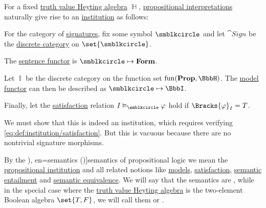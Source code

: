 \begin{definition}\label{def:propositional_institution}\mimprovised
  For a fixed \hyperref[def:truth_value_algebra]{truth value Heyting algebra} \( \BbbH \), \hyperref[def:propositional_valuation/interpretation]{propositional interpretations} naturally give rise to an \hyperref[def:institution]{institution} as follows:
  \begin{thmenum}
     For the category of \hyperref[def:institution/signatures]{signatures}, fix some symbol \( \anon \) and let \( \cat{Sign} \) be the \hyperref[def:discrete_category]{discrete category} on \( \set{ \anon } \).

     The \hyperref[def:institution/sentences]{sentence functor} is \( \anon \mapsto \op*{Form} \).

     Let \( \BbbI \) be the discrete category on the function set \( \fun(\op*{Prop}, \BbbH) \). The \hyperref[def:institution/models]{model functor} can then be described as \( \anon \mapsto \BbbI \).

     Finally, let the \hyperref[def:institution/satisfaction]{satisfaction} relation \( I \vDash_{\anon} \varphi \) hold if \( \Bracks{\varphi}_I = T \).
  \end{thmenum}
\end{definition}
\begin{defproof}
  We must show that this is indeed an institution, which requires verifying \eqref{eq:def:institution/satisfaction}. But this is vacuous because there are no nontrivial signature morphisms.
\end{defproof}

\begin{definition}\label{def:propositional_semantics}\mimprovised
  By the \term[ru=семантика (\cite[54]{КолмогоровДрагалин2006}), en=semantics (\cite[8]{Hinman2005})]{semantics} of propositional logic we mean the \hyperref[def:propositional_institution]{propositional institution} and all related notions like \hyperref[def:institution/models]{models}, \hyperref[def:institution/satisfaction]{satisfaction}, \hyperref[def:institutional_entailment]{semantic entailment} and \hyperref[def:semantic_equivalence]{semantic equivalence}. We will say that the semantics are , while in the special case where the \hyperref[def:truth_value_algebra]{truth value Heyting algebra} is the two-element Boolean algebra \( \set{ T, F } \), we will call them  or .
\end{definition}

